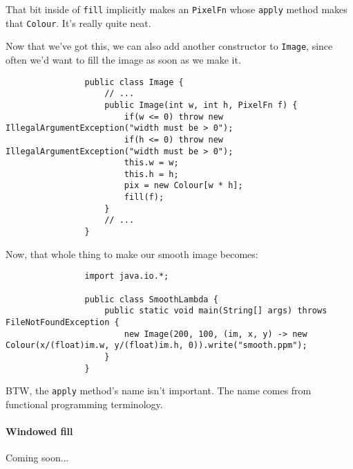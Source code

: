 \documentclass{article}
\begin{document}
            That bit inside of \texttt{fill} implicitly makes an \texttt{PixelFn} whose \texttt{apply} method makes that \texttt{Colour}.
            It's really quite neat.
            
            Now that we've got this, we can also add another constructor to \texttt{Image}, since often we'd want to fill the image as soon
            as we make it.
            
            \begin{verbatim}
                public class Image {
                    // ...
                    public Image(int w, int h, PixelFn f) {
                        if(w <= 0) throw new IllegalArgumentException("width must be > 0");
                        if(h <= 0) throw new IllegalArgumentException("width must be > 0");
                        this.w = w;
                        this.h = h;
                        pix = new Colour[w * h];
                        fill(f);
                    }
                    // ...
                }
            \end{verbatim}
            
            Now, that whole thing to make our smooth image becomes:
            
            \begin{verbatim}
                import java.io.*;

                public class SmoothLambda {
                    public static void main(String[] args) throws FileNotFoundException {
                        new Image(200, 100, (im, x, y) -> new Colour(x/(float)im.w, y/(float)im.h, 0)).write("smooth.ppm");
                    }
                }
            \end{verbatim}
        
            BTW, the \texttt{apply} method's name isn't important. The name comes from functional programming terminology.
        
        \paragraph{Windowed fill}
            Coming soon...
        
\end{document}
